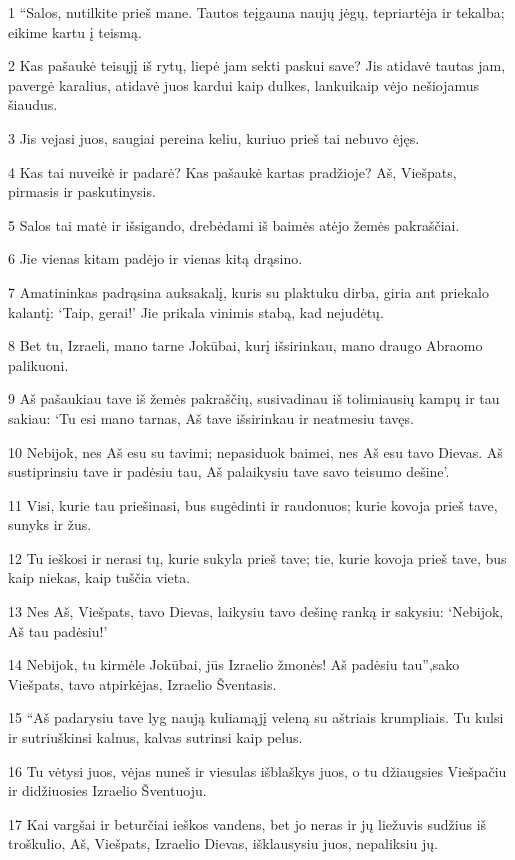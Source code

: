 \par 1 “Salos, nutilkite prieš mane. Tautos teįgauna naujų jėgų, tepriartėja ir tekalba; eikime kartu į teismą. 
\par 2 Kas pašaukė teisųjį iš rytų, liepė jam sekti paskui save? Jis atidavė tautas jam, pavergė karalius, atidavė juos kardui kaip dulkes, lankui­kaip vėjo nešiojamus šiaudus. 
\par 3 Jis vejasi juos, saugiai pereina keliu, kuriuo prieš tai nebuvo ėjęs. 
\par 4 Kas tai nuveikė ir padarė? Kas pašaukė kartas pradžioje? Aš, Viešpats, pirmasis ir paskutinysis. 
\par 5 Salos tai matė ir išsigando, drebėdami iš baimės atėjo žemės pakraščiai. 
\par 6 Jie vienas kitam padėjo ir vienas kitą drąsino. 
\par 7 Amatininkas padrąsina auksakalį, kuris su plaktuku dirba, giria ant priekalo kalantį: ‘Taip, gerai!’ Jie prikala vinimis stabą, kad nejudėtų. 
\par 8 Bet tu, Izraeli, mano tarne Jokūbai, kurį išsirinkau, mano draugo Abraomo palikuoni. 
\par 9 Aš pašaukiau tave iš žemės pakraščių, susivadinau iš tolimiausių kampų ir tau sakiau: ‘Tu esi mano tarnas, Aš tave išsirinkau ir neatmesiu tavęs. 
\par 10 Nebijok, nes Aš esu su tavimi; nepasiduok baimei, nes Aš esu tavo Dievas. Aš sustiprinsiu tave ir padėsiu tau, Aš palaikysiu tave savo teisumo dešine’. 
\par 11 Visi, kurie tau priešinasi, bus sugėdinti ir raudonuos; kurie kovoja prieš tave, sunyks ir žus. 
\par 12 Tu ieškosi ir nerasi tų, kurie sukyla prieš tave; tie, kurie kovoja prieš tave, bus kaip niekas, kaip tuščia vieta. 
\par 13 Nes Aš, Viešpats, tavo Dievas, laikysiu tavo dešinę ranką ir sakysiu: ‘Nebijok, Aš tau padėsiu!’ 
\par 14 Nebijok, tu kirmėle Jokūbai, jūs Izraelio žmonės! Aš padėsiu tau”,­sako Viešpats, tavo atpirkėjas, Izraelio Šventasis. 
\par 15 “Aš padarysiu tave lyg naują kuliamąjį veleną su aštriais krumpliais. Tu kulsi ir sutriuškinsi kalnus, kalvas sutrinsi kaip pelus. 
\par 16 Tu vėtysi juos, vėjas nuneš ir viesulas išblaškys juos, o tu džiaugsies Viešpačiu ir didžiuosies Izraelio Šventuoju. 
\par 17 Kai vargšai ir beturčiai ieškos vandens, bet jo neras ir jų liežuvis sudžius iš troškulio, Aš, Viešpats, Izraelio Dievas, išklausysiu juos, nepaliksiu jų. 
